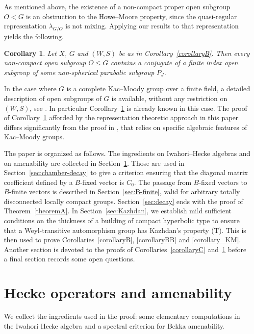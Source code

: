 \documentclass[12pt,a4paper]{amsproc}
\newtheorem{corintro}[thmintro]{Corollary}
\theoremstyle{definition}
\begin{document}
As mentioned above, the existence of a non-compact proper open subgroup $O < G$ is an obstruction to the Howe--Moore property, since the quasi-regular representation $\lambda_{G/O}$ is not mixing. Applying our results to that representation yields the following. 

\begin{corintro}
\label{corollary_open}
Let $X$, $G$ and $(W,S)$ be as in Corollary~\ref{corollaryB}.  Then every non-compact open subgroup $O \leq G$ contains a conjugate of a finite index open subgroup of some non-spherical parabolic subgroup $P_J$. 
\end{corintro}

In the   case where $G$ is a complete Kac--Moody group over a finite field, a detailed description of open subgroups of $G$ is available,  without any restriction on $(W, S)$, see \cite{CapMar}.  In particular Corollary~\ref{corollary_open} is already known in this case. The proof of Corollary~\ref{corollary_open} afforded by the representation theoretic approach in this paper differs significantly from the proof in \cite{CapMar}, that relies on specific algebraic features of Kac--Moody groups.
	
\medskip
The paper is organized as follows. The ingredients on Iwahori--Hecke algebras and on amenability are collected in Section~\ref{sec:Hecke}. Those are used in Section~\ref{sec:chamber-decay} to give a criterion ensuring that the diagonal matrix coefficient defined by a $B$-fixed vector is $C_0$. The passage from $B$-fixed vectors to $B$-finite vectors is described in Section~\ref{sec:B-finite}, valid for arbitrary totally disconnected locally compact groups. Section~\ref{sec:decay} ends with the proof of Theorem~\ref{theoremA}. In Section~\ref{sec:Kazhdan}, we establish mild sufficient conditions on the thickness of a building of compact hyperbolic type to ensure that a Weyl-transitive automorphism group has Kazhdan's property (T).  This is then used to prove Corollaries~\ref{corollaryB}, \ref{corollaryBB} and \ref{corollary_KM}. Another  section is  devoted to the proofs of Corollaries~\ref{corollaryC} and~\ref{corollary_open} before a final section records some open questions.

\section{Hecke operators and amenability}\label{sec:Hecke}

We collect the ingredients used in the proof: some elementary computations in the Iwahori Hecke algebra and a spectral criterion for Bekka amenability.
\end{document}

